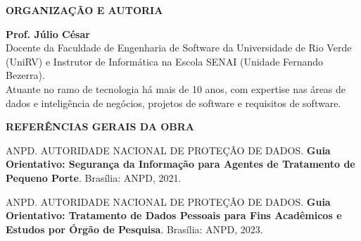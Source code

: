 \documentclass[12pt,a4paper]{article}
\begin{document}
\begin{center}
\textbf{\fontsize{14}{16}\selectfont \color{black} ORGANIZAÇÃO E AUTORIA}
\end{center}

\vspace{1.5em}

\begin{singlespace}
\noindent \textbf{Prof. Júlio César}\\[0.3em]
\noindent Docente da Faculdade de Engenharia de Software da Universidade de Rio Verde (UniRV) e Instrutor de Informática na Escola SENAI (Unidade Fernando Bezerra).\\[0.2em]
\noindent Atuante no ramo de tecnologia há mais de 10 anos, com expertise nas áreas de dados e inteligência de negócios, projetos de software e requisitos de software.
\end{singlespace}

\newpage




\newpage


\newpage


\newpage


\newpage


\newpage

\begin{center}
\textbf{\fontsize{14}{16}\selectfont REFERÊNCIAS GERAIS DA OBRA}
\end{center}

\vspace{1.5em}

\noindent ANPD. AUTORIDADE NACIONAL DE PROTEÇÃO DE DADOS. \textbf{Guia Orientativo: Segurança da Informação para Agentes de Tratamento de Pequeno Porte}. Brasília: ANPD, 2021.

\vspace{0.8em}
\noindent ANPD. AUTORIDADE NACIONAL DE PROTEÇÃO DE DADOS. \textbf{Guia Orientativo: Tratamento de Dados Pessoais para Fins Acadêmicos e Estudos por Órgão de Pesquisa}. Brasília: ANPD, 2023.
\end{document}
